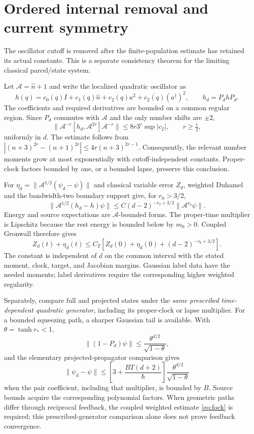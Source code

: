 \documentclass[11pt]{article}
\begin{document}
\section{Ordered internal removal and current symmetry}
The oscillator cutoff is removed after the finite-population estimate has retained its actual constants. This is a separate consistency theorem for the limiting classical parcel/state system.

Let $\mathcal A=\widehat n+1$ and write the localized quadratic oscillator as
\[
h(q)=c_0(q)I+c_1(q)\widehat n
+c_2(q)a^2+\overline{c_2(q)}(a^\dagger)^2,
\qquad h_d=P_dhP_d.
\]
The coefficients and required derivatives are bounded on a common regular region. Since $P_d$ commutes with $\mathcal A$ and the only number shifts are $\pm2$,
\[
\|\mathcal A^{-r}[h_d,\mathcal A^{2r}]\mathcal A^{-r}\|
\le8r3^r\sup|c_2|,\qquad r\ge\tfrac12,
\]
uniformly in $d$. The estimate follows from
$|(n+3)^{2r}-(n+1)^{2r}|\le4r(n+3)^{2r-1}$.
Consequently, the relevant number moments grow at most exponentially with cutoff-independent constants. Proper-clock factors bounded by one, or a bounded lapse, preserve this conclusion.

For $\eta_d=\|\mathcal A^{1/2}(\psi_d-\psi)\|$ and classical variable error $Z_d$, weighted Duhamel and the bandwidth-two boundary support give, for $r_0>3/2$,
\[
\|\mathcal A^{1/2}(h_d-h)\psi\|
\le C(d-2)^{-r_0+3/2}\|\mathcal A^{r_0}\psi\|.
\]
Energy and source expectations are $\mathcal A$-bounded forms. The proper-time multiplier is Lipschitz because the rest energy is bounded below by $m_0>0$. Coupled Gronwall therefore gives
\begin{equation}\label{eq:fock}
Z_d(t)+\eta_d(t)\le C_T
\left[Z_d(0)+\eta_d(0)+(d-2)^{-r_0+3/2}\right].
\end{equation}
The constant is independent of $d$ on the common interval with the stated moment, clock, target, and Jacobian margins. Gaussian label data have the needed moments; label derivatives require the corresponding higher weighted regularity.

Separately, compare full and projected states under the \emph{same prescribed time-dependent quadratic generator}, including its proper-clock or lapse multiplier. For a bounded squeezing path, a sharper Gaussian tail is available. With $\theta=\tanh r_*<1$,
\[
\|(1-P_d)\psi\|\le\frac{\theta^{d/2}}{\sqrt{1-\theta}},
\]
and the elementary projected-propagator comparison gives
\[
\|\psi_d-\psi\|
\le\left[3+\frac{BT(d+2)}{\hbar}\right]
\frac{\theta^{d/2}}{\sqrt{1-\theta}}
\]
when the pair coefficient, including that multiplier, is bounded by $B$. Source bounds acquire the corresponding polynomial factors. When geometric paths differ through reciprocal feedback, the coupled weighted estimate \eqref{eq:fock} is required; this prescribed-generator comparison alone does not prove feedback convergence.
\end{document}
